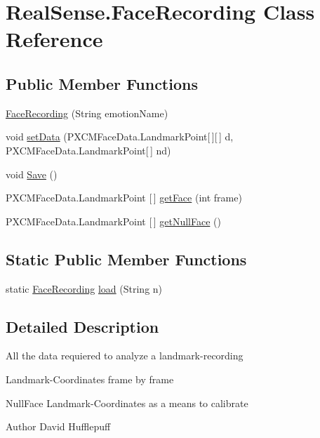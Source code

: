 \hypertarget{class_real_sense_1_1_face_recording}{}\section{Real\+Sense.\+Face\+Recording Class Reference}
\label{class_real_sense_1_1_face_recording}
\subsection*{Public Member Functions}
\begin{DoxyCompactItemize}
\item 
\hyperlink{class_real_sense_1_1_face_recording_a06fe1ad41d77cd359dd583c70d1f6e35}{Face\+Recording} (String emotion\+Name)
\item 
void \hyperlink{class_real_sense_1_1_face_recording_a94e9208ed4f1fe15264ab3b2293f3ce4}{set\+Data} (P\+X\+C\+M\+Face\+Data.\+Landmark\+Point\mbox{[}$\,$\mbox{]}\mbox{[}$\,$\mbox{]} d, P\+X\+C\+M\+Face\+Data.\+Landmark\+Point\mbox{[}$\,$\mbox{]} nd)
\item 
void \hyperlink{class_real_sense_1_1_face_recording_a856729fd53a364765b202b3a9fb6f5dd}{Save} ()
\item 
P\+X\+C\+M\+Face\+Data.\+Landmark\+Point \mbox{[}$\,$\mbox{]} \hyperlink{class_real_sense_1_1_face_recording_a8a5e0b5187f8f71e490c612289df757f}{get\+Face} (int frame)
\item 
P\+X\+C\+M\+Face\+Data.\+Landmark\+Point \mbox{[}$\,$\mbox{]} \hyperlink{class_real_sense_1_1_face_recording_adb306111dec190d5852088978ea2459e}{get\+Null\+Face} ()
\end{DoxyCompactItemize}
\subsection*{Static Public Member Functions}
\begin{DoxyCompactItemize}
\item 
static \hyperlink{class_real_sense_1_1_face_recording}{Face\+Recording} \hyperlink{class_real_sense_1_1_face_recording_a61d844c987701d6a21c0ce83333bdf14}{load} (String n)
\end{DoxyCompactItemize}


\subsection{Detailed Description}
All the data requiered to analyze a landmark-\/recording
\begin{DoxyItemize}
\item Landmark-\/\+Coordinates frame by frame
\item Null\+Face Landmark-\/\+Coordinates as a means to calibrate \begin{DoxyAuthor}{Author}
David  Hufflepuff 
\end{DoxyAuthor}

\end{DoxyItemize}

